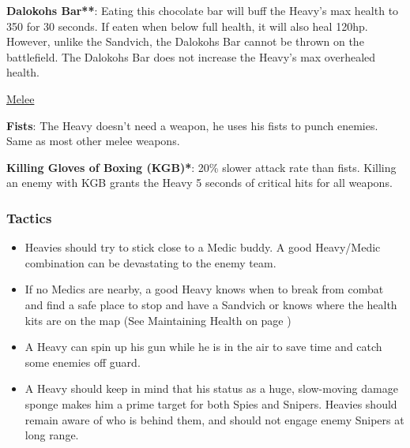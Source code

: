 {\bf Dalokohs Bar**}: Eating this chocolate bar will buff the Heavy's max health to 350 for 30 seconds. If eaten when below full health, it will also heal 120hp. However, unlike the Sandvich, the Dalokohs Bar cannot be thrown on the battlefield. The Dalokohs Bar does not increase the Heavy's max overhealed health.

\newpage

\begin {center}
\underline {Melee}
\end {center}

{\bf Fists}: The Heavy doesn't need a weapon, he uses his fists to punch enemies. Same as most other melee weapons.

{\bf Killing Gloves of Boxing (KGB)*}: 20\% slower attack rate than fists.  Killing an enemy with KGB grants the Heavy 5 seconds of critical hits for all weapons.


\subsubsection {Tactics}
\begin {itemize}

\item Heavies should try to stick close to a Medic buddy. A good Heavy/Medic combination can be devastating to the enemy team. 

\item If no Medics are nearby, a good Heavy knows when to break from combat and find a safe place to stop and have a Sandvich or knows where the health kits are on the map (See Maintaining Health on page \pageref{Maintaining_Health})

\item A Heavy can spin up his gun while he is in the air to save time and catch some enemies off guard.

\item A Heavy should keep in mind that his status as a huge, slow-moving damage sponge makes him a prime target for both Spies and Snipers. Heavies should remain aware of who is behind them, and should not engage enemy Snipers at long range.

\end {itemize}